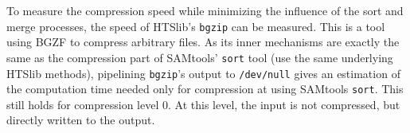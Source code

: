 To measure the compression speed while minimizing the influence of the sort and merge processes, the speed of HTSlib's \texttt{bgzip} can be measured. This is a tool using BGZF to compress arbitrary files. As its inner mechanisms are exactly the same as the compression part of SAMtools' \texttt{sort} tool (use the same underlying HTSlib methods), pipelining \texttt{bgzip}'s output to \texttt{/dev/null} gives an estimation of the computation time needed only for compression at using SAMtools \texttt{sort}. This still holds for compression level 0. At this level, the input is not compressed, but directly written to the output.

